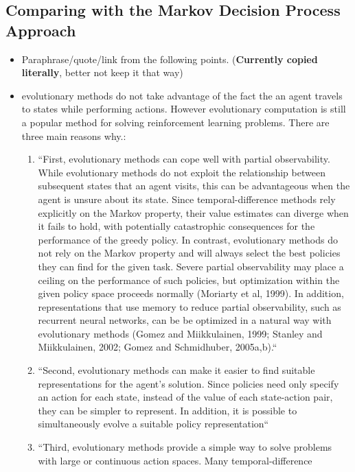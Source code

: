 \subsection{Comparing with the Markov Decision Process Approach}
\begin{itemize}
	\item Paraphrase/quote/link from \citep{Whiteson2012} the following points.
		(\textbf{Currently copied literally}, better not keep it that way)
	\item evolutionary methods do not take advantage of the fact the an agent travels
          to states while performing actions. However evolutionary computation
		  is still a popular method for solving reinforcement learning
		  problems. There are three main reasons why.:
		  \begin{enumerate}
			  \item ``First, evolutionary methods can cope well with
					partial observability. While evolutionary methods do not exploit the relationship
					between subsequent states that an agent visits, this can be advantageous when the
					agent is unsure about its state. Since temporal-difference methods rely explicitly
					on the Markov property, their value estimates can diverge when it fails to hold,
					with potentially catastrophic consequences for the performance of the greedy policy.
					In contrast, evolutionary methods do not rely on the Markov property and will always
					select the best policies they can find for the given task. Severe partial
					observability may place a ceiling on the performance of such policies, but
					optimization within the given policy space proceeds normally (Moriarty et al, 1999).
					In addition, representations that use memory to reduce partial observability,
					such as recurrent neural networks, can be be optimized in a natural way with
					evolutionary methods (Gomez and Miikkulainen, 1999; Stanley and Miikkulainen, 2002;
					Gomez and Schmidhuber, 2005a,b).``
				\item ``Second, evolutionary methods can make it easier to find
					suitable representations for the agent’s solution. Since policies need only specify
					an action for each state, instead of the value of each state-action pair, they can be
					simpler to represent. In addition, it is possible to simultaneously evolve a
					suitable policy representation``
				\item ``Third, evolutionary methods provide a simple way to solve
					problems with large or continuous action spaces. Many temporal-difference

\end{enumerate}
\end{itemize}
